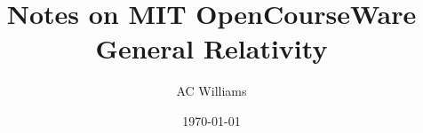 

\documentclass [10pt]{article}
\usepackage{cancel}
\usepackage{graphicx}%
\usepackage{dcolumn}%
\usepackage{bm}%
\usepackage{times}
\usepackage{mathptm}
\usepackage{epsfig}
\usepackage{float}
\usepackage{amsmath}
\usepackage{amsfonts}
\usepackage{amssymb}
\usepackage{mathrsfs}
\usepackage{subcaption}
\usepackage{mathtools,slashed}
\oddsidemargin=-2.1cm
\textwidth=18.5cm
\textheight=8.7in
\topmargin=-1.0cm
\leftmargin=2.0cm


\title {Notes on MIT OpenCourseWare General Relativity}

\author {AC Williams}
\date{\today}


\maketitle













